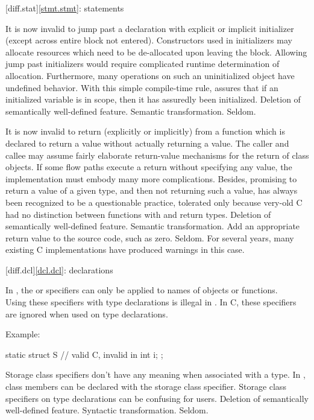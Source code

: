 [diff.stat]{\ref{stmt.stmt}: statements}

\change
It is now invalid to jump past a declaration with explicit or implicit initializer (except across entire block not entered).
\rationale
Constructors used in initializers may allocate
resources which need to be de-allocated upon leaving the
block.
Allowing jump past initializers would require
complicated runtime determination of allocation.
Furthermore, many operations on such an uninitialized object
have undefined behavior.
With this simple compile-time rule, \Cpp{} assures that
if an initialized variable is in scope, then it has assuredly been
initialized.
\effect
Deletion of semantically well-defined feature.
\difficulty
Semantic transformation.
\howwide
Seldom.

\change
It is now invalid to return (explicitly or implicitly) from a function which is
declared to return a value without actually returning a value.
\rationale
The caller and callee may assume fairly elaborate
return-value mechanisms for the return of class objects.
If
some flow paths execute a return without specifying any value,
the implementation must embody many more complications.
Besides,
promising to return a value of a given type, and then not returning
such a value, has always been recognized to be a questionable
practice, tolerated only because very-old C had no distinction between
functions with  and  return types.
\effect
Deletion of semantically well-defined feature.
\difficulty
Semantic transformation.
Add an appropriate return value to the source code, such as zero.
\howwide
Seldom.
For several years, many existing C implementations have produced warnings in
this case.

[diff.dcl]{\ref{dcl.dcl}: declarations}

\change
In \Cpp{}, the  or  specifiers can only be applied to names of objects or functions.\\
Using these specifiers with type declarations is illegal in \Cpp{}.
In C, these specifiers are ignored when used on type declarations.

Example:
\begin{codeblock}
static struct S {               // valid C, invalid in \Cpp{}
  int i;
};
\end{codeblock}

\rationale
Storage class specifiers don't have any meaning when associated
with a type.
In \Cpp{}, class members can be declared with the  storage
class specifier.
Storage class specifiers on type
declarations can be confusing for users.
\effect
Deletion of semantically well-defined feature.
\difficulty
Syntactic transformation.
\howwide
Seldom.

